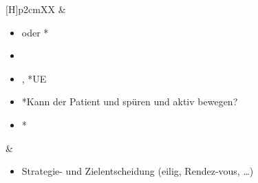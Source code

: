 {\begin{minipage}[t]{\linewidth -
{2\fboxrule} - {2\fboxsep}}
\begin{minipage}[t]{\linewidth}
{\begin{tabularx}{\linewidth}[H]{p{2cm}XX}
&
\begin{minipage}[t]{\linewidth}
\begin{itemize}
    \item {} oder *
    \item {}
    \item {}, *UE
    \item *Kann der
    Patient  und  spüren und aktiv
    bewegen?
  \item *
\end{itemize}
\end{minipage}
&
\noindent\color{DefaultA}\begin{minipage}[t]{\linewidth}
\begin{itemize}
  \item Strategie- und Zielentscheidung (eilig, Rendez-vous, \ldots)
\end{itemize}
\end{minipage}
\\\addlinespace\midrule\addlinespace
\noindent{}



\end{tabularx}}
\end{minipage}
\end{minipage}}
